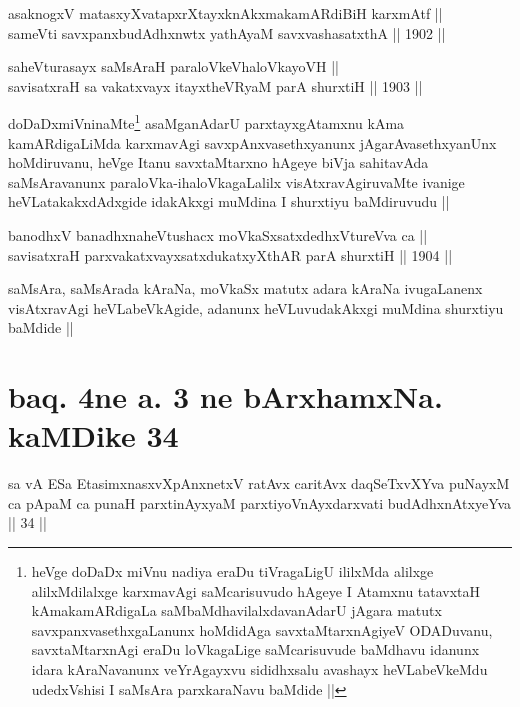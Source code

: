 \begin{shl}
asaknogxV matasxyXvatapxrXtayxknAkxmakamARdiBiH karxmAtf || \\
sameVti savxpanxbudAdhxnwtx yathA\s yaM savxvashasatxthA ||  1902 ||  
\end{shl}
				
\begin{shl}
saheVturasayx saMsAraH paraloVkeVhaloVkayoVH || \\
savisatxraH sa vakatxvayx itayxtheVRyaM parA shurxtiH ||  1903 ||  
\end{shl}

\begin{artha}
doDaDxmiVninaMte\footnote[1]{heVge doDaDx miVnu nadiya eraDu
  tiVragaLigU ililxMda alilxge alilxMdilalxge karxmavAgi saMcarisuvudo
hAgeye I Atamxnu tatavxtaH kAmakamARdigaLa saMbaMdhavilalxdavanAdarU
jAgara matutx savxpanxvasethxgaLanunx hoMdidAga savxtaMtarxnAgiyeV
ODADuvanu, savxtaMtarxnAgi eraDu loVkagaLige saMcarisuvude baMdhavu
idanunx idara kAraNavanunx veYrAgayxvu sididhxsalu avashayx
heVLabeVkeMdu udedxVshisi I saMsAra parxkaraNavu baMdide ||} asaMganAdarU parxtayxgAtamxnu kAma
kamARdigaLiMda karxmavAgi savxpAnxvasethxyanunx jAgarAvasethxyanUnx
hoMdiruvanu, heVge Itanu savxtaMtarxno hAgeye biVja sahitavAda
saMsAravanunx paraloVka-ihaloVkagaLalilx visAtxravAgiruvaMte ivanige
heVLatakakxdAdxgide idakAkxgi muMdina I shurxtiyu baMdiruvudu ||
\end{artha}


\begin{shl}
banodhxV banadhxnaheVtushacx moVkaSxsatxdedhxVtureVva ca || \\
savisatxraH parxvakatxvayxsatxdukatxyXthAR parA shurxtiH ||  1904 ||  
\end{shl}

\begin{artha}
saMsAra, saMsArada kAraNa, moVkaSx matutx adara kAraNa ivugaLanenx
visAtxravAgi heVLabeVkAgide, adanunx heVLuvudakAkxgi muMdina shurxtiyu
baMdide ||
\end{artha}

\section*{baq. 4ne a. 3 ne bArxhamxNa. kaMDike 34}

\begin{shl}
sa vA ESa EtasimxnasxvXpAnxnetxV ratAvx caritAvx daqSeTxvXYva puNayxM ca pApaM ca punaH parxtinAyxyaM parxtiyoVnAyxdarxvati budAdhxnAtxyeYva || 34 ||
\end{shl}


